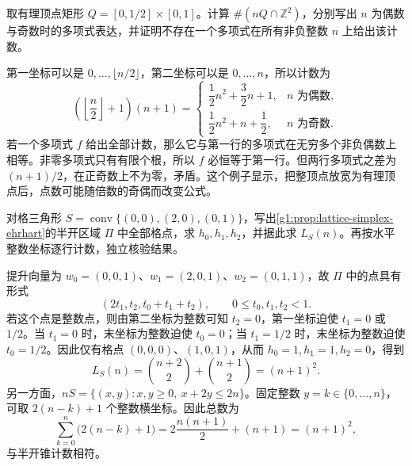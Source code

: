 \begin{exercise}
	\label{g1:ex:rational-count-parity}
	取有理顶点矩形 \(Q=[0,1/2]\times[0,1]\)。计算 \(\#(nQ\cap\mathbb Z^2)\)，分别写出 \(n\) 为偶数与奇数时的多项式表达，并证明不存在一个多项式在所有非负整数 \(n\) 上给出该计数。
\end{exercise}
\begin{solution}
	第一坐标可以是 \(0,\ldots,\lfloor n/2\rfloor\)，第二坐标可以是 \(0,\ldots,n\)，所以计数为
	\[
		\left(\left\lfloor\frac n2\right\rfloor+1\right)(n+1)
		=\begin{cases}
			\dfrac12n^2+\dfrac32n+1,&n\text{ 为偶数},\\[3pt]
			\dfrac12n^2+n+\dfrac12,&n\text{ 为奇数}.
		\end{cases}
	\]
	若一个多项式 \(f\) 给出全部计数，那么它与第一行的多项式在无穷多个非负偶数上相等。非零多项式只有有限个根，所以 \(f\) 必恒等于第一行。但两行多项式之差为 \((n+1)/2\)，在正奇数上不为零，矛盾。这个例子显示，把整顶点放宽为有理顶点后，点数可能随倍数的奇偶而改变公式。
\end{solution}

\begin{exercise}
	\label{g1:ex:simplex-cone-remainders}
	对格三角形 \(S=\operatorname{conv}\{(0,0),(2,0),(0,1)\}\)，写出\cref{g1:prop:lattice-simplex-ehrhart}的半开区域 \(\Pi\) 中全部格点，求 \(h_0,h_1,h_2\)，并据此求 \(L_S(n)\)。再按水平整数坐标逐行计数，独立核验结果。
\end{exercise}
\begin{solution}
	提升向量为 \(w_0=(0,0,1)\)、\(w_1=(2,0,1)\)、\(w_2=(0,1,1)\)，故 \(\Pi\) 中的点具有形式
	\[
		(2t_1,t_2,t_0+t_1+t_2),\qquad 0\le t_0,t_1,t_2<1.
	\]
	若这个点是整数点，则由第二坐标为整数可知 \(t_2=0\)，第一坐标迫使 \(t_1=0\) 或 \(1/2\)。当 \(t_1=0\) 时，末坐标为整数迫使 \(t_0=0\)；当 \(t_1=1/2\) 时，末坐标为整数迫使 \(t_0=1/2\)。因此仅有格点 \((0,0,0)\)、\((1,0,1)\)，从而 \(h_0=1,h_1=1,h_2=0\)，得到
	\[
		L_S(n)=\binom{n+2}{2}+\binom{n+1}{2}=(n+1)^2.
	\]
	另一方面，\(nS=\{(x,y):x,y\ge0,\ x+2y\le2n\}\)。固定整数 \(y=k\in\{0,\ldots,n\}\)，可取 \(2(n-k)+1\) 个整数横坐标。因此总数为
	\[
		\sum_{k=0}^n\bigl(2(n-k)+1\bigr)
		=2\frac{n(n+1)}2+(n+1)=(n+1)^2,
	\]
	与半开锥计数相符。
\end{solution}

